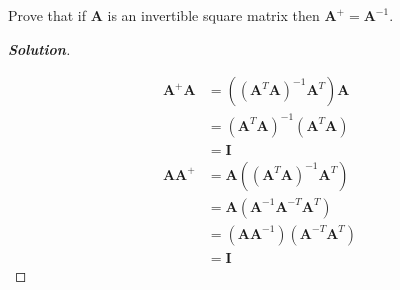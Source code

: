 \documentclass[11pt]{article}
\renewcommand{\vec}[1]{\mathbf{#1}}
\newenvironment{problem}[2][Question]{\begin{trivlist}
\item[\hskip \labelsep {\bfseries #1}\hskip \labelsep {\bfseries #2.}]}{\end{trivlist}}
\newenvironment{solution}{%
  \begin{proof}[\textbf{Solution}]$ $\par\nobreak\ignorespaces
}{%
  \end{proof}
}
\theoremstyle{definition}
\begin{document}
\begin{problem}{3.2.4}
Prove that if $\vec{A}$ is an invertible square matrix then $\vec{A}^+ = \vec{A}^{-1}$.
\end{problem}
\begin{solution}
\begin{align*}
    \vec{A}^+\vec{A} &= ((\vec{A}^T\vec{A})^{-1}\vec{A}^T)\vec{A} \\
    &= (\vec{A}^T\vec{A})^{-1}(\vec{A}^T\vec{A}) \\
    &= \vec{I} \\
    \vec{A}\vec{A}^+ &= \vec{A}((\vec{A}^T\vec{A})^{-1}\vec{A}^T) \\
    &= \vec{A}(\vec{A}^{-1}\vec{A}^{-T}\vec{A}^T) \\
    &= (\vec{A}\vec{A}^{-1})(\vec{A}^{-T}\vec{A}^T) \\
    &= \vec{I}    
\end{align*}
\end{solution}
\end{document}
